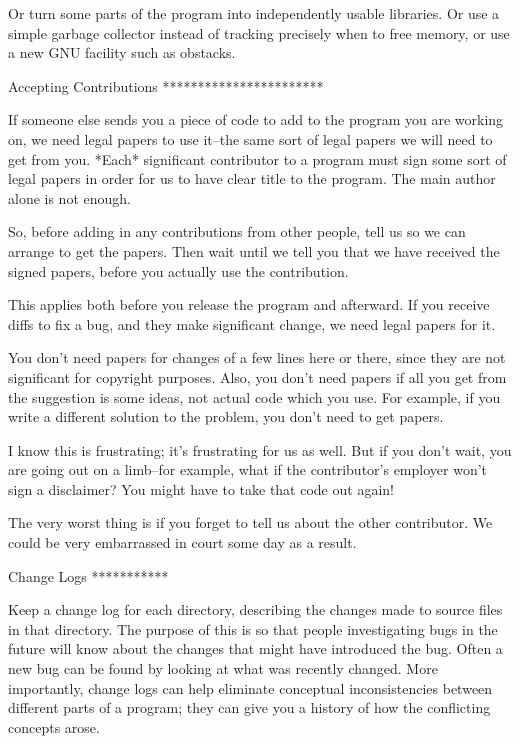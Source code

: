    Or turn some parts of the program into independently usable
libraries.  Or use a simple garbage collector instead of tracking
precisely when to free memory, or use a new GNU facility such as
obstacks.

Accepting Contributions
***********************

   If someone else sends you a piece of code to add to the program you
are working on, we need legal papers to use it--the same sort of legal
papers we will need to get from you.  *Each* significant contributor to
a program must sign some sort of legal papers in order for us to have
clear title to the program.  The main author alone is not enough.

   So, before adding in any contributions from other people, tell us so
we can arrange to get the papers.  Then wait until we tell you that we
have received the signed papers, before you actually use the
contribution.

   This applies both before you release the program and afterward.  If
you receive diffs to fix a bug, and they make significant change, we
need legal papers for it.

   You don't need papers for changes of a few lines here or there, since
they are not significant for copyright purposes.  Also, you don't need
papers if all you get from the suggestion is some ideas, not actual code
which you use.  For example, if you write a different solution to the
problem, you don't need to get papers.

   I know this is frustrating; it's frustrating for us as well.  But if
you don't wait, you are going out on a limb--for example, what if the
contributor's employer won't sign a disclaimer?  You might have to take
that code out again!

   The very worst thing is if you forget to tell us about the other
contributor.  We could be very embarrassed in court some day as a
result.

Change Logs
***********

   Keep a change log for each directory, describing the changes made to
source files in that directory.  The purpose of this is so that people
investigating bugs in the future will know about the changes that might
have introduced the bug.  Often a new bug can be found by looking at
what was recently changed.  More importantly, change logs can help
eliminate conceptual inconsistencies between different parts of a
program; they can give you a history of how the conflicting concepts
arose.

